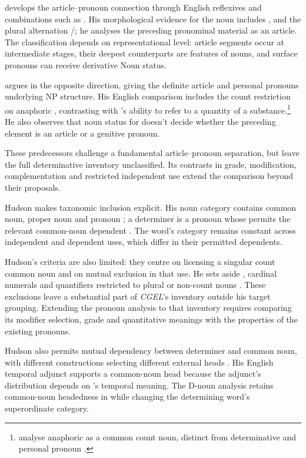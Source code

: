 \documentclass[12pt]{article}
\begin{document}
\textcite{postal1966} develops the article--pronoun connection through English reflexives and combinations such as . His morphological evidence for the noun  includes ,  and the plural alternation /; he analyses the preceding pronominal material as an article. The classification depends on representational level: article segments occur at intermediate stages, their deepest counterparts are features of nouns, and surface pronouns can receive derivative Noun status.

\textcite[197--203]{sommerstein1972} argues in the opposite direction, giving the definite article and personal pronouns underlying NP structure. His English comparison includes the count restriction on anaphoric , contrasting with 's ability to refer to a quantity of a substance.\footnote{\textcite[797--798]{payne2013anaphoric} analyse anaphoric  as a common count noun, distinct from determinative  and personal pronoun .} He also observes that noun status for  doesn't decide whether the preceding element is an article or a genitive pronoun.

These predecessors challenge a fundamental article--pronoun separation, but leave the full determinative inventory unclassified. Its contrasts in grade, modification, complementation and restricted independent use extend the comparison beyond their proposals.

Hudson makes taxonomic inclusion explicit. His noun category contains common noun, proper noun and pronoun \citep[253--254]{hudson2010wordgrammar}; a determiner is a pronoun whose  permits the relevant common-noun dependent \citep[9--10]{hudson2004determiners}. The word's category remains constant across independent and dependent uses, which differ in their permitted dependents.

Hudson's criteria are also limited: they centre on licensing a singular count common noun and on mutual exclusion in that use. He sets aside , cardinal numerals and quantifiers restricted to plural or non-count nouns \citep[9--10]{hudson2004determiners}. These exclusions leave a substantial part of \textit{CGEL}'s inventory outside his target grouping. Extending the pronoun analysis to that inventory requires comparing its modifier selection, grade and quantitative meanings with the properties of the existing pronouns.

Hudson also permits mutual dependency between determiner and common noun, with different constructions selecting different external heads \citep[7--12]{hudson2004determiners}. His English temporal adjunct  supports a common-noun head because the adjunct's distribution depends on 's temporal meaning. The D-noun analysis retains common-noun headedness in  while changing the determining word's superordinate category.
\end{document}
